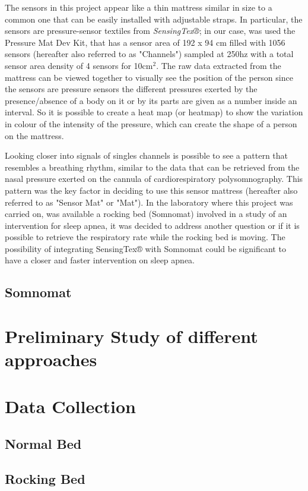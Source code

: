 The sensors in this project appear like a thin mattress similar in size to a common one that can be easily installed with adjustable straps.
In particular, the sensors are pressure-sensor textiles from \textit{SensingTex®}; in our case, was used the Pressure Mat Dev Kit,
 that has a sensor area of 192 x 94 cm filled with 1056 sensors (hereafter also referred to as "Channels") sampled at 250hz
 with a total sensor area density of 4 sensors for 10cm$^2$.
 The raw data extracted from the mattress can be viewed together to visually see the position of the person since the sensors are pressure sensors
the different pressures exerted by the presence/absence of a body on it or by its parts are given as a number inside an interval. 
So it is possible to create a heat map (or heatmap) to show the variation in colour of the intensity of the pressure, which can create the shape of
a person on the mattress.

Looking closer into signals of singles channels is possible to see a pattern that resembles a breathing rhythm,  similar to the data that can
 be retrieved from the nasal pressure exerted on the cannula of cardiorespiratory polysomnography.
This pattern was the key factor in deciding to use this sensor mattress (hereafter also referred to as "Sensor Mat" or "Mat"). 
In the laboratory where this project was carried on, was available a rocking bed (Somnomat) involved in a study of an intervention for 
sleep apnea, it was decided to address another question or if it is possible to retrieve the respiratory rate while the rocking bed is moving.
The possibility of integrating SensingTex® with Somnomat could be significant to have a closer and faster intervention on sleep apnea.
\subsection{Somnomat}
\section{Preliminary Study of different approaches} 
\section{Data Collection}
\subsection{Normal Bed}
\subsection{Rocking Bed}

